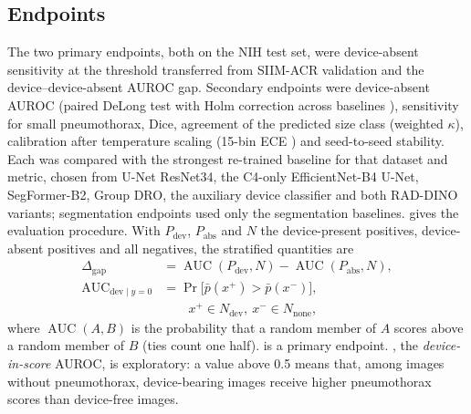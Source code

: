 \documentclass{ieeeaccess}
\DeclareMathOperator{\AUC}{AUC}
\begin{document}
\subsection{Endpoints}
\label{sec:endpoints}
The two primary endpoints, both on the NIH test set, were device-absent sensitivity at the threshold transferred from SIIM-ACR validation and the device--device-absent AUROC gap. Secondary endpoints were device-absent AUROC (paired DeLong test with Holm correction across baselines \cite{delong1988,holm1979}), sensitivity for small pneumothorax, Dice, agreement of the predicted size class (weighted $\kappa$), calibration after temperature scaling (15-bin ECE \cite{guo2017calibration}) and seed-to-seed stability. Each was compared with the strongest re-trained baseline for that dataset and metric, chosen from U-Net ResNet34, the C4-only EfficientNet-B4 U-Net, SegFormer-B2, Group DRO, the auxiliary device classifier and both RAD-DINO variants; segmentation endpoints used only the segmentation baselines.  gives the evaluation procedure. With $P_{\text{dev}}$, $P_{\text{abs}}$ and $N$ the device-present positives, device-absent positives and all negatives, the stratified quantities are
\begin{align}
\Delta_{\text{gap}} &= \AUC(P_{\text{dev}},N)-\AUC(P_{\text{abs}},N), \label{eq:gap}\\
\AUC_{\text{dev}\mid y=0} &= \Pr\big[\bar p(x^{+})>\bar p(x^{-})\big], \label{eq:devscore}\\
&\qquad x^{+}\in N_{\text{dev}},\ x^{-}\in N_{\text{none}}, \nonumber
\end{align}
where $\AUC(A,B)$ is the probability that a random member of $A$ scores above a random member of $B$ (ties count one half).  is a primary endpoint. , the \emph{device-in-score} AUROC, is exploratory: a value above 0.5 means that, among images without pneumothorax, device-bearing images receive higher pneumothorax scores than device-free images.
\end{document}
